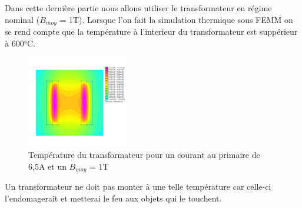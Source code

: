 Dans cette dernière partie nous allons utiliser le transformateur en régime nominal ($B_{moy}$ = 1T).  Lorsque l'on fait la simulation thermique sous FEMM on se rend compte que la température à l'interieur du transformateur est suppérieur à 600°C. 
\begin{figure}[ht]
	\begin{center}
	\includegraphics[width=0.40\textwidth]{images/TP3_thermo}
	\caption{Température du transformateur pour un courant au primaire de 6,5A et un $B_{moy}$ = 1T}\label{img:TransfoThermo}
	\end{center}
\end{figure}

Un transformateur ne doit pas monter à une telle température car celle-ci l'endomagerait et metterai le feu aux objets qui le touchent.


